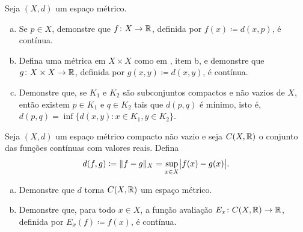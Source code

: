 \begin{samepage}
\begin{exercise}
Seja $(X,d)$ um espaço métrico.
\begin{enumerate}[a)]
\item
Se $p \in X$,
demonstre que $f \colon X \to {\mathbb{R}}$, definida
por $f(x) \coloneqq d(x,p)$, é contínua.
\item
Defina uma métrica em $X \times X$ como em , item
b, e demonstre que $g \colon X \times X \to {\mathbb{R}}$, definida por
$g(x,y) \coloneqq d(x,y)$, é contínua.
\item
Demonstre que, se $K_1$ e $K_2$ são subconjuntos compactos e não vazios de $X$, então
existem $p \in K_1$ e $q \in K_2$ tais que $d(p,q)$ é mínimo,
isto é, $d(p,q) = \inf \{ d(x,y) \colon x \in K_1, y \in K_2 \}$.
\end{enumerate}
\end{exercise}
\end{samepage}

\begin{exercise}
Seja $(X,d)$ um espaço métrico compacto não vazio e seja $C(X,{\mathbb{R}})$ o conjunto
das funções contínuas com valores reais. Defina
\begin{equation*}
d(f,g) \coloneqq \lVert {f-g} \rVert_X = \sup_{x \in X} \bigl\lvert {f(x)-g(x)} \bigr\rvert .
\end{equation*}
\begin{enumerate}[a)]
\item
Demonstre que $d$ torna $C(X,{\mathbb{R}})$ um espaço métrico.
\item
Demonstre que, para todo $x \in X$, a função avaliação
$E_x \colon C(X,{\mathbb{R}}) \to {\mathbb{R}}$, definida por $E_x(f) \coloneqq f(x)$,
é contínua.
\end{enumerate}
\end{exercise}

